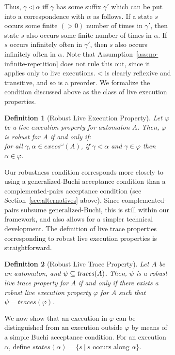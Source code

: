 \documentclass[11pt]{article}
\newcommand{\bd}{\begin{definition}}
\newcommand{\ed}{\end{definition}}
\newcommand{\al}{\alpha}
\newcommand{\iexecs}{\mathit{execs}^\omega}
\newcommand{\ga}{\gamma}
\newcommand{\states}{\mathit{states}}
\newcommand{\subs}{\lhd}		\newcommand{\suc}{\mathit{succ}}	\newcommand{\topp}{\mathit{top}}\newcommand{\trace}{\mathit{trace}}
\newcommand{\traces}{\mathit{traces}}
\newtheorem{definition}{Definition}
\begin{document}
\begin{figure}[htb]
\begin{figure}[htb]
Thus, $\ga \subs \al$ iff $\ga$ has some suffix $\ga'$ which can be
put into a correspondence with $\al$ as follows. If a state $s$
occurs some finite $(> 0)$ number of times in $\ga'$, 
then state $s$ also occurs some finite number of times in $\al$.
If $s$ occurs infinitely often in $\ga'$, then $s$ also occurs
infinitely often in $\al$. Note that Assumption~\ref{ass:no-infinite-repetition}
does not rule this out, since it applies only to live executions.
$\subs$ is clearly reflexive and transitive, and so is a preorder.
We formalize the condition discussed above as the class of 
 live execution properties.

\bd[Robust Live Execution Property]
\label{def:robust-live-execution-property}
Let $\varphi$ be a live execution property for automaton $A$.
Then, $\varphi$ is \emph{robust for $A$} if and only if:\\
\ind for all $\ga, \al \in \iexecs(A)$, 
       if $\ga \subs \al$ and $\ga \in \varphi$ then $\al \in \varphi$.
\ed

Our robustness condition corresponds more closely to using a
generalized-Buchi acceptance condition than a complemented-pairs
acceptance condition (see Section~\ref{sec:alternatives} above). Since
complemented-pairs subsume generalized-Buchi, this is still within our
framework, and also allows for a simpler technical development.
The definition of live trace properties corresponding to robust live
execution properties is straightforward.

\bd[Robust Live Trace Property]
\label{def:robust-live-trace-property}
Let $A$ be an automaton, and $\psi \sub \traces(A)$. Then,
$\psi$ is a \emph{robust live trace property} for $A$ if and only if
there exists a robust live execution property $\varphi$ for $A$ such that 
$\psi = \traces(\varphi)$.
\ed




We now show that an execution in $\varphi$ can be distinguished
from an execution outside $\varphi$ by means of a simple Buchi
acceptance condition.
For an execution $\al$, define $\states(\al) = \{ s ~|~ s
\mbox{ occurs along } \al \}$.




\end{figure}
\end{figure}
\end{document}
